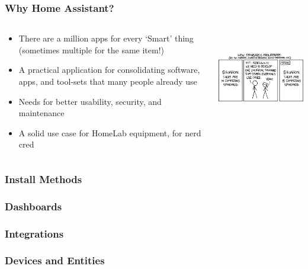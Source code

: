 \documentclass[aspectratio=169]{beamer}
\begin{document}
\begin{frame}[fragile]
  \frametitle{Why Home Assistant?}
  \begin{columns}[]
    \begin{column}[T]{0.45\paperwidth}
      \begin{itemize}%
        \item{There are a million apps for every `Smart' thing (sometimes multiple for the same item!)}
        \item{A practical application for consolidating software, apps, and tool-sets that many people already use}
        \item{Needs for better usability, security, and maintenance}
        \item{A solid use case for HomeLab equipment, for nerd cred}
     \end{itemize}
    \end{column}
    \begin{column}[T]{0.45\paperwidth}
      \includegraphics[height=4cm,keepaspectratio]{images/standards.png}
    \end{column}
  \end{columns}
\end{frame}

\subsubsection{Install Methods}
\subsubsection{Dashboards}
\subsubsection{Integrations}
\subsubsection{Devices and Entities}
\end{document}
